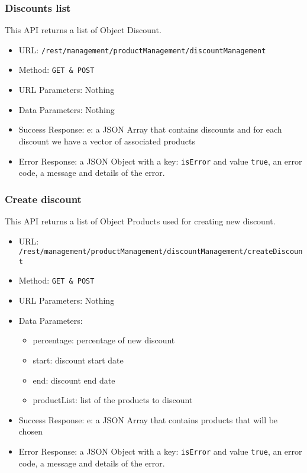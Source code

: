 \subsubsection*{Discounts list}
This API returns a list of Object Discount.

\begin{itemize}
    \item URL: \texttt{/rest/management/productManagement/discountManagement}
    \item Method: \texttt{{GET \& POST}}
    \item URL Parameters: Nothing
    \item Data Parameters: Nothing
    \item Success Response: e: a JSON Array that contains discounts and for each discount we have a vector of associated products
    \item Error Response: a JSON Object with a key: \texttt{isError}  and value \texttt{true}, an error code, a message and details of the error.
\end{itemize}

\subsubsection*{Create discount}
This API returns a list of Object Products used for creating new discount.

\begin{itemize}
    \item URL: \texttt{/rest/management/productManagement/discountManagement/createDiscount}
    \item Method: \texttt{{GET \& POST}}
    \item URL Parameters: Nothing
    \item Data Parameters: 
    \begin{itemize}
        \item percentage: percentage of new discount
        \item start: discount start date
        \item end: discount end date
        \item productList: list of the products to discount
    \end{itemize} 
    \item Success Response: e: a JSON Array that contains products that will be chosen
    \item Error Response: a JSON Object with a key: \texttt{isError}  and value \texttt{true}, an error code, a message and details of the error.
\end{itemize}

